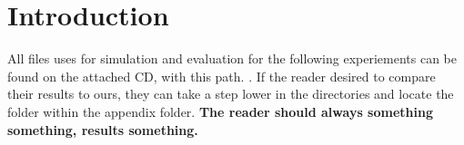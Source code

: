 \section{Introduction}

All files uses for simulation and evaluation for the following experiements can be found on the attached CD, with this path. . If the reader desired to compare their results to ours, they can take a step lower in the directories and locate the folder  within the appendix folder. \textbf{The reader should always something something, results something.}